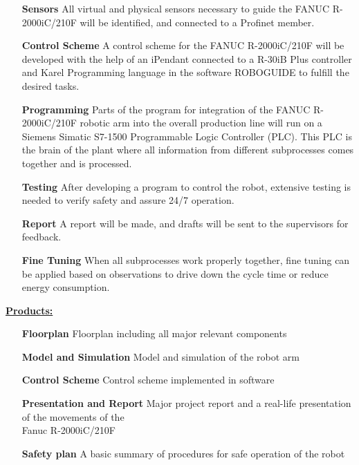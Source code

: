 \begin{itemize}[leftmargin=5cm]
	\item[\textbf{Sensors}] All virtual and physical sensors necessary to guide the FANUC R-2000iC/210F will be identified, and connected to a Profinet member.
	\item[\textbf{Control Scheme}] A control scheme for the FANUC R-2000iC/210F will be developed with the help of an iPendant connected to a R-30iB Plus controller and Karel Programming language in the software ROBOGUIDE to fulfill the desired tasks. 
	\item[\textbf{Programming}] Parts of the program for integration of the FANUC R-2000iC/210F robotic arm into the overall production line will run on a Siemens Simatic S7-1500 Programmable Logic Controller (PLC). This PLC is the brain of the plant where all information from different subprocesses comes together and is processed.
	\item[\textbf{Testing}] After developing a program to control the robot, extensive testing is needed to verify safety and assure 24/7 operation.
	\item[\textbf{Report}] A report will be made, and drafts will be sent to the supervisors for feedback.	
	\item[\textbf{Fine Tuning}] When all subprocesses work properly together, fine tuning can be applied based on observations to drive down the cycle time or reduce energy consumption. 
\end{itemize}
\bigskip
\underline{\textbf{Products:}}\vspace{2mm}
\begin{itemize}[leftmargin=5cm]
	\item[\textbf{Floorplan}] Floorplan including all major relevant components
	\item[\textbf{Model and Simulation}] Model and simulation of the robot arm %
	\item[\textbf{Control Scheme}] Control scheme implemented in software 
	\item[\textbf{Presentation and Report}] Major project report and a real-life presentation of the movements of the \\Fanuc R-2000iC/210F
	\item[\textbf{Safety plan}] A basic summary of procedures for safe operation of the robot
\end{itemize}
%
